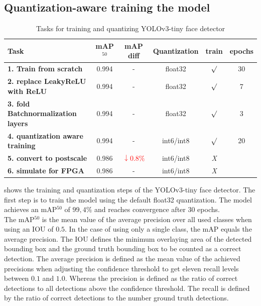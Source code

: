 \documentclass[%
a4paper,
twoside,
openany,
dvipsnames
]
{report}
\begin{document}
\subsection{Quantization-aware training the model}
\begin{table}[h]
	\centering
	\begin{tabular}{lc cc c c}
		\toprule[1.5pt]
		\textbf{Task} & \textbf{mAP}$^{50}$ & \textbf{mAP diff} & \textbf{Quantization} & \textbf{train} &\textbf{epochs}  \\
		\midrule[1.5pt] 
		\textbf{1. Train from scratch} & 0.994 & - & float32 & $\surd$ & 30 \\
		\textbf{2. replace LeakyReLU with ReLU} & 0.994 & - & float32 & $\surd$ & 7  \\
		\textbf{3. fold Batchnormalization layers}  & 0.994 & - & float32 & $\surd$ & 3 \\
		\textbf{4. quantization aware training} & 0.994 & - & int6/int8 & $\surd$ & 20  \\
		\textbf{5. convert to postscale} & 0.986 &  \textcolor{red}{$\downarrow 0.8\%$} & int6/int8 & \textit{X} & \\
		\textbf{6. simulate for FPGA}  & 0.986 & - & int6/int8 & \textit{X} &  \\  							
		\bottomrule[1.5pt]
	\end{tabular}
	\caption{Tasks for training and quantizing YOLOv3-tiny face detector}	
	\label{tab:quantization-tasks}
\end{table}
 shows the training and quantization steps of the YOLOv3-tiny face detector. The first step is to train the model using the default float32 quantization. The model achieves an \gls{mAP}$^{50}$ of $99,4\%$ and reaches convergence after 30 epochs. \\
The \gls{mAP}$^{50}$ is the  mean value of the average precision over all used classes when using an \gls{IOU} of $0.5$. In the case of using only a single class, the \gls{mAP} equals the average precision. The \gls{IOU} defines the minimum overlaying area of the detected bounding box and the ground truth bounding box to be counted as a correct detection. The average precision is defined as the mean value of the achieved precisions when adjusting the confidence threshold to get eleven recall levels between $0.1$ and $1.0$. Whereas the precision is defined as the ratio of correct detections to all detections above the confidence threshold. The recall is defined by the ratio of correct detections to the number ground truth detections. \\
\end{document}
